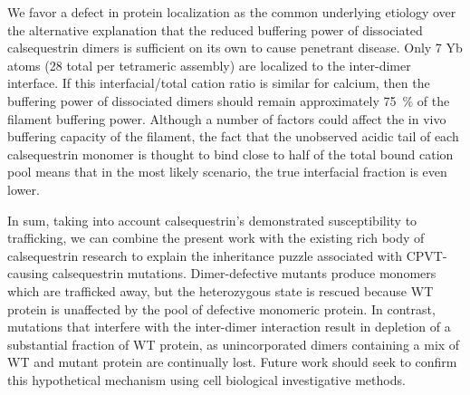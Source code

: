 \begin{hlbreakable}
We favor a defect in protein localization as the common underlying etiology over the alternative explanation that the reduced buffering power of dissociated calsequestrin dimers is sufficient on its own to cause penetrant disease. Only 7 Yb atoms (28 total per tetrameric assembly) are localized to the inter-dimer interface. If this interfacial/total cation ratio is similar for calcium, then the buffering power of dissociated dimers should remain approximately \SI{75}{\percent} of the filament buffering power. Although a number of factors could affect the in vivo buffering capacity of the filament, the fact that the unobserved acidic tail of each calsequestrin monomer is thought to bind close to half of the total bound cation pool \cite{Park2004-bu} means that in the most likely scenario, the true interfacial fraction is even lower. 
\end{hlbreakable}
In sum, taking into account calsequestrin's demonstrated susceptibility to trafficking, we can combine the present work with the existing rich body of calsequestrin research to explain the inheritance puzzle associated with CPVT-causing calsequestrin mutations. Dimer-defective mutants produce monomers which are trafficked away, but the heterozygous state is rescued because WT protein is unaffected by the pool of defective monomeric protein. In contrast, mutations that interfere with the inter-dimer interaction result in depletion of a substantial fraction of WT protein, as unincorporated dimers containing a mix of WT and mutant protein are continually lost. Future work should seek to confirm this hypothetical mechanism using cell biological investigative methods.

